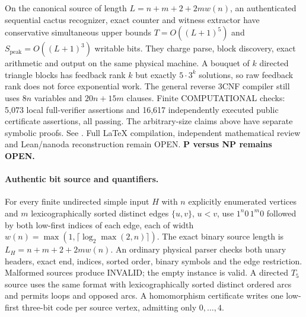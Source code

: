 \documentclass[11pt]{article}
\begin{document}
\noindent On the canonical source of length
$L=n+m+2+2mw(n)$, an authenticated sequential
cactus recognizer, exact counter and witness
extractor have conservative simultaneous upper
bounds $T=O((L+1)^5)$ and
$S_{\mathrm{peak}}=O((L+1)^3)$ writable bits.
They charge parse, block discovery, exact arithmetic
and output on the same physical machine.
A bouquet of $k$ directed triangle blocks has
feedback rank $k$ but exactly $5\cdot3^k$ solutions,
so raw feedback rank does not force exponential work.
The general reverse $3$CNF compiler still uses
$8n$ variables and $20n+15m$ clauses.
Finite COMPUTATIONAL checks: 5,073 local full-verifier
assertions and 16,617 independently executed public
certificate assertions, all passing. The arbitrary-size
claims above have separate symbolic proofs.
See .
Full \LaTeX{} compilation, independent mathematical review
and Lean/nanoda reconstruction remain OPEN.
\textbf{P versus NP remains OPEN.}

\paragraph{Authentic bit source and quantifiers.}
For every finite undirected simple input $H$ with $n$ explicitly
enumerated vertices and $m$ lexicographically sorted distinct edges
$\{u,v\}$, $u<v$, use
$1^n0\,1^m0$ followed by both low-first indices of each edge,
each of width $w(n)=\max(1,\lceil\log_2\max(2,n)\rceil)$.
The exact binary source length is
$L_H=n+m+2+2mw(n)$.
An ordinary physical parser checks both unary headers, exact end,
indices, sorted order, binary symbols and the edge restriction.
Malformed sources produce INVALID; the empty instance is valid.
A directed $T_5$ source uses the same format with lexicographically
sorted distinct ordered arcs and permits loops and opposed arcs.
A homomorphism certificate writes one low-first three-bit code per
source vertex, admitting only $0,\ldots,4$.
\end{document}
